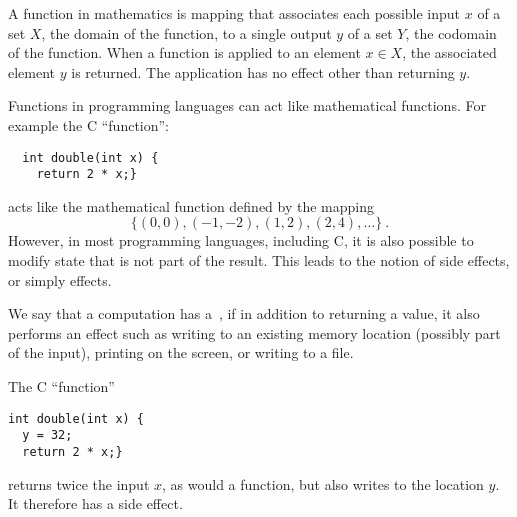 \begin{cluster}
\label{grp:grm:language::functional-algorithms::function}

\begin{gram}
\label{grm:language::functional-algorithms::function}
A function in mathematics is mapping that associates each
possible input $x$ of a set $X$, the domain of the function, to a
single output $y$ of a set $Y$, the codomain of the function.
When a function is applied to an element $x \in X$, the associated
element $y$ is returned.     The application has no effect other than
returning $y$.

Functions in programming languages can act like mathematical functions.   For
example the C ``function'':
\begin{verbatim}
  int double(int x) { 
    return 2 * x;}
\end{verbatim}
acts like the mathematical function defined by the mapping \[\{(0,0), (-1, -2), (1,2), (2, 4),
  \ldots\}~.\]    However, in most programming languages, including C, it is also 
possible to modify state that is not part of the result.    This leads
to the notion of side effects, or simply effects.

\end{gram}
\end{cluster}

\begin{flex}
\label{grp:def:language::functional-algorithms::side-effects}

\begin{definition}
\label{def:language::functional-algorithms::side-effects}
We say that a computation has a~, if in addition to
returning a value, it also performs an effect such as writing to an
existing memory location (possibly part of the input), printing on the screen, or writing to a
file.

\end{definition}

\begin{example}
\label{xmpl:language::functional-algorithms::function}
The C ``function''  
\begin{verbatim} 
int double(int x) { 
  y = 32; 
  return 2 * x;}
\end{verbatim}
returns twice the input $x$, as would a function, but also writes to
the location $y$.  It therefore has a side effect.

\end{example}
\end{flex}


